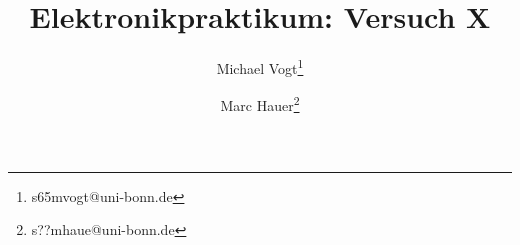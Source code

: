 \documentclass{article}
\title{Elektronikpraktikum: Versuch X}
\author{Michael Vogt\thanks{s65mvogt@uni-bonn.de}}
\author{Marc Hauer\thanks{s??mhaue@uni-bonn.de}}
\begin{document}
\maketitle
\tableofcontents
\newpage
{}

\pagestyle{fancy}
\fancyhead[R]{\thepage}
\fancyhead[L]{\leftmark}

\begin{multicols}{2}



\end{multicols}
\end{document}
